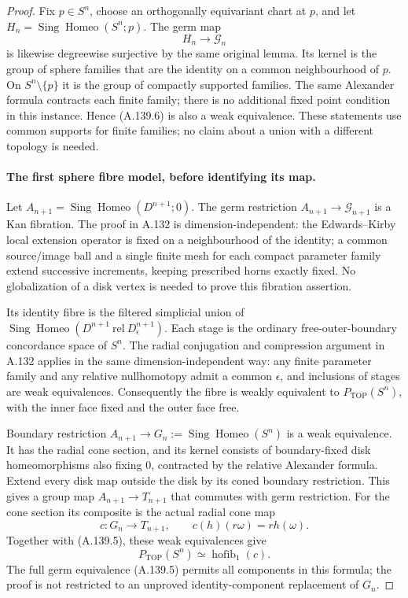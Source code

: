 \begin{proof}
Fix $p\in S^n$, choose an orthogonally equivariant chart at $p$,
and let $H_n=\operatorname{Sing}\operatorname{Homeo}(S^n;p)$.
The germ map
\[
                        H_n\longrightarrow\mathcal G_n
                                                               \tag{A.139.6}
\]
is likewise degreewise surjective by the same original lemma.
Its kernel is the group of sphere families that are the identity
on a common neighbourhood of $p$. On $S^n\setminus\{p\}$ it is
the group of compactly supported families. The same Alexander
formula contracts each finite family; there is no additional fixed
point condition in this instance. Hence (A.139.6) is also a weak
equivalence. These statements use common supports for finite
families; no claim about a union with a different topology is needed.

\paragraph{The first sphere fibre model, before identifying its map.}
Let $A_{n+1}=\operatorname{Sing}\operatorname{Homeo}(D^{n+1};0)$.
The germ restriction
$A_{n+1}\to\mathcal G_{n+1}$ is a Kan fibration. The proof in
A.132 is dimension-independent: the Edwards--Kirby local extension
operator is fixed on a neighbourhood of the identity; a common
source/image ball and a single finite mesh for each compact
parameter family extend successive increments, keeping prescribed
horns exactly fixed. No globalization of a disk vertex is needed
to prove this fibration assertion.

Its identity fibre is the filtered simplicial union of
$\operatorname{Sing}\operatorname{Homeo}(D^{n+1}\ \mathrm{rel}\
D_\epsilon^{n+1})$. Each stage is the ordinary free-outer-boundary
concordance space of $S^n$. The radial conjugation and compression
argument in A.132 applies in the same dimension-independent way:
any finite parameter family and any relative nullhomotopy admit a
common $\epsilon$, and inclusions of stages are weak equivalences.
Consequently the fibre is weakly equivalent to
$P_{\mathrm{TOP}}(S^n)$, with the inner face fixed and the outer
face free.

Boundary restriction $A_{n+1}\to
G_n:=\operatorname{Sing}\operatorname{Homeo}(S^n)$ is a weak
equivalence. It has the radial cone section, and its kernel consists
of boundary-fixed disk homeomorphisms also fixing $0$, contracted
by the relative Alexander formula. Extend every disk map outside
the disk by its coned boundary restriction. This gives a group map
$A_{n+1}\to T_{n+1}$ that commutes with germ restriction.
For the cone section its composite is the actual radial cone map
\[
 c:G_n\longrightarrow T_{n+1},\qquad
 c(h)(r\omega)=r h(\omega).                             \tag{A.139.7}
\]
Together with (A.139.5), these weak equivalences give
\[
 P_{\mathrm{TOP}}(S^n)\simeq\operatorname{hofib}_1(c).
                                                               \tag{A.139.8}
\]
The full germ equivalence (A.139.5) permits all components in this
formula; the proof is not restricted to an unproved identity-component
replacement of $G_n$.


\end{proof}
